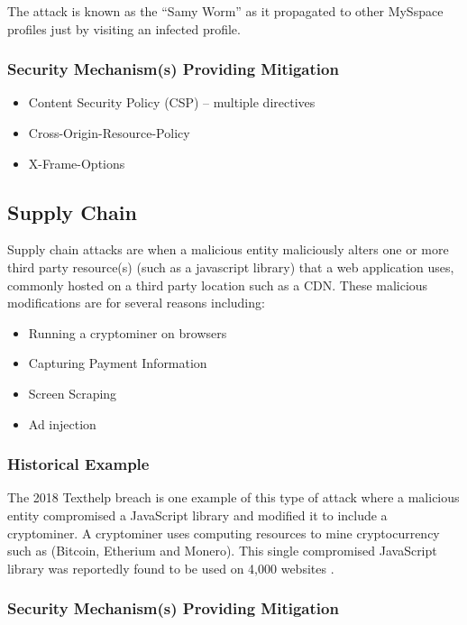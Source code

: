 \documentclass{mscreport}
\begin{document}
\vspace{0.2cm} \noindent
The attack is known as the ``Samy Worm'' as it propagated to other MySspace profiles just by visiting an infected profile.

\subsubsection{Security Mechanism(s) Providing Mitigation}

\begin{itemize}
	\setlength\itemsep{0.1em}
	\item Content Security Policy (CSP) – multiple directives
	\item Cross-Origin-Resource-Policy
	\item X-Frame-Options
\end{itemize}


\subsection{Supply Chain}
\label{subsection:SupplyChain}

Supply chain attacks are when a malicious entity maliciously alters one or more third party resource(s) (such as a javascript library) that a web application uses, commonly hosted on a third party location such as a CDN. These malicious modifications are for several reasons including:

\begin{itemize}
	\setlength\itemsep{0.1em}
	\item Running a cryptominer \cite{Tekiner2021-sq} on browsers
	\item Capturing Payment Information
	\item Screen Scraping
	\item Ad injection
\end{itemize}

\subsubsection{Historical Example}
The 2018 Texthelp breach is one example of this type of attack where a malicious entity compromised a JavaScript library and modified it to include a cryptominer. A cryptominer uses computing resources to mine cryptocurrency such as (Bitcoin, Etherium and Monero). This single compromised JavaScript library was reportedly found to be used on 4,000 websites \cite{Billman2018-sq}.

\subsubsection{Security Mechanism(s) Providing Mitigation}
\end{document}
